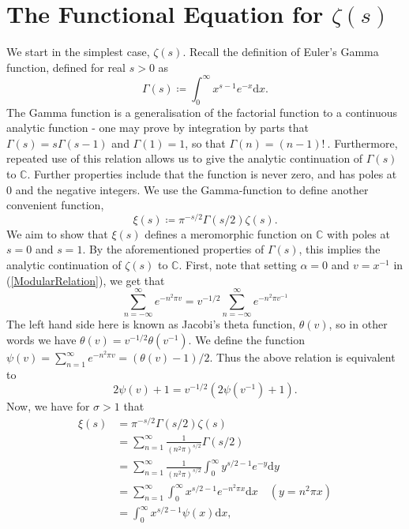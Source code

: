 \section{The Functional Equation for $\zeta(s)$}
We start in the simplest case, $\zeta(s)$. Recall the definition of Euler's Gamma function, defined for real $s > 0$ as 
\begin{equation}
    \Gamma(s) \coloneqq \int_{0}^{\infty}x^{s - 1} e^{-x} \mathrm{d} x. \nonumber
\end{equation}
The Gamma function is a generalisation of the factorial function to a continuous analytic function - one may prove by integration by parts that $\Gamma(s) = s\Gamma(s - 1)$ and $\Gamma(1) = 1$, so that $\Gamma(n) = (n - 1)! \ $. Furthermore, repeated use of this relation allows us to give the analytic continuation of $\Gamma(s)$ to $\mathbb{C}$. Further properties include that the function is never zero, and has poles at 0 and the negative integers. We use the Gamma-function to define another convenient function, 
\begin{equation}
    \xi(s) \coloneqq \pi^{-s/2} \Gamma(s/2) \zeta(s). \nonumber
\end{equation}
We aim to show that $\xi(s)$ defines a meromorphic function on $\mathbb{C}$ with poles at $s=0$ and $s=1$. By the aforementioned properties of $\Gamma(s)$, this implies the analytic continuation of $\zeta(s)$ to $\mathbb{C}$. First, note that setting $\alpha = 0$ and $v = x^{-1}$ in (\ref{ModularRelation}), we get that 
\begin{equation}
    \sum_{n=-\infty}^{\infty} e^{-n^{2} \pi v} = v^{-1/2} \sum_{n=-\infty}^{\infty}e^{-n^{2}\pi v^{-1}} \nonumber
\end{equation}
The left hand side here is known as Jacobi's theta function, $\theta(v)$, so in other words we have $\theta(v) = v^{-1/2}\theta(v^{-1})$. We define the function $\psi(v) = \sum_{n=1}^{\infty}e^{-n^{2}\pi v} = (\theta(v) - 1)/2$. Thus the above relation is equivalent to
\begin{equation}
\label{psiRelation}
   2\psi(v) + 1 = v^{-1/2}\left(2\psi(v^{-1}) + 1 \right).
\end{equation}
Now, we have for $\sigma > 1$ that
\begin{align}
    \xi(s) &= \pi^{-s/2} \Gamma(s/2) \zeta(s) \nonumber \\
    &= \sum_{n=1}^{\infty} \frac{1}{(n^{2}\pi)^{s/2}} \Gamma(s/2) \nonumber \\
    &= \sum_{n=1}^{\infty} \frac{1}{(n^{2}\pi)^{s/2}} \int_{0}^{\infty} y^{s/2 - 1} e^{-y} \mathrm{d} y \nonumber \\
    &= \sum_{n=1}^{\infty} \int_{0}^{\infty} x^{s/2 - 1} e^{-n^{2} \pi x} \mathrm{d} x \quad (y = n^{2}\pi x) \nonumber \\
    &= \int_{0}^{\infty} x^{s/2 - 1} \psi(x) \mathrm{d}x, \nonumber
\end{align}
